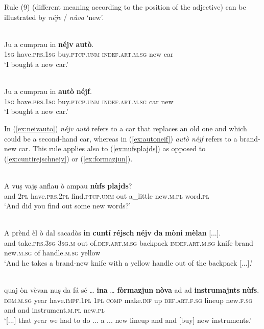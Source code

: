 Rule (9) (different meaning according to the position of the adjective) can be illustrated by \textit{néjv} / \textit{nùva} `new'.

\ea
\label{ex:neivauto}
\\
\gll Ju a cumprau in \textbf{néjv} \textbf{autò}.\\
\textsc{1sg} have\textsc{.prs.1sg} buy.\textsc{ptcp.unm} \textsc{indef.art.m.sg} new car\\
\glt `I bought a new car.'
\z

\ea
\label{ex:autoneif}
\\
\gll Ju a cumprau in \textbf{autò} \textbf{néjf}.\\
\textsc{1sg} have\textsc{.prs.1sg} buy.\textsc{ptcp.unm} \textsc{indef.art.m.sg} car new\\
\glt `I bought a new car.'
\z

In (\ref{ex:neivauto}) \textit{néjv autò} refers to a car that replaces an old one and which could be a second-hand car, whereas in (\ref{ex:autoneif}) \textit{autò néjf} refers to a brand-new car. This rule applies also to (\ref{ex:nufsplajds}) as opposed to (\ref{ex:cuntirejschnejv}) or (\ref{ex:formazjun}).

\ea
\label{ex:nufsplajds}
\\
\gll A vuṣ vajṣ anflau ò ampau \textbf{nùfs} \textbf{plajds}?    \\
and \textsc{2pl} have.\textsc{prs.2pl} find.\textsc{ptcp.unm} out a\_little new.\textsc{m.pl} word.\textsc{pl}\\
\glt `And did you find out some new words?'
\z


\ea
\label{ex:cuntirejschnejv}
\\
\gll A prènd èl ò dal sacadòs \textbf{in} \textbf{cuntí} \textbf{réjsch} \textbf{néjv} \textbf{da} \textbf{mòni} \textbf{mèlan} [...].\\
and take.\textsc{prs.3sg} \textsc{3sg.m} out of.\textsc{def.art.m.sg} backpack \textsc{indef.art.m.sg} knife brand new.\textsc{m.sg} of handle.\textsc{m.sg} yellow\\
\glt `And he takes a brand-new knife with a yellow handle out of the backpack [...].'
\z

\ea
\label{ex:formazjun}
\\
\gll  [...] quaj òn vèvan nuṣ da fá sé … \textbf{ina} … \textbf{fòrmazjun} \textbf{nòva} ad ad \textbf{instrumajnts} \textbf{nùfs}.\\
{} \textsc{dem.m.sg} year have.\textsc{impf.1pl} \textsc{1pl} \textsc{comp} make.\textsc{inf} up {} \textsc{def.art.f.sg} {} lineup  new.\textsc{f.sg} and and instrument.\textsc{m.pl} new.\textsc{pl}\\
\glt `[...] that year we had to do ... a ... new lineup and and [buy] new instruments.'
\z

